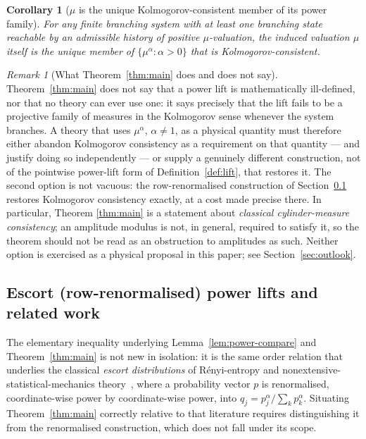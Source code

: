 \documentclass[11pt,a4paper]{article}
\newtheorem{corollary}[theorem]{Corollary}
\theoremstyle{definition}
\theoremstyle{remark}
\newtheorem{remark}[theorem]{Remark}
\begin{document}
\begin{corollary}[$\mu$ is the unique Kolmogorov-consistent member of its power family]
  \label{cor:unique}
  For any finite branching system with at least one branching state reachable by an
  admissible history of positive $\mu$-valuation, the induced valuation $\mu$ itself is
  the unique member of $\{\mu^\alpha : \alpha>0\}$ that is Kolmogorov-consistent.
\end{corollary}

\begin{remark}[What Theorem~\ref{thm:main} does and does not say]
  \label{rem:scope}
  Theorem~\ref{thm:main} does not say that a power lift is mathematically
  ill-defined, nor that no theory can ever use one: it says precisely that the lift
  fails to be a projective family of measures in the Kolmogorov sense whenever the
  system branches. A theory that uses $\mu^\alpha$, $\alpha\ne1$, as a physical
  quantity must therefore either abandon Kolmogorov consistency as a requirement on
  that quantity --- and justify doing so independently --- or supply a genuinely
  different construction, not of the pointwise power-lift form of
  Definition~\ref{def:lift}, that restores it. The second option is not vacuous: the
  row-renormalised construction of Section~\ref{sec:escort} restores Kolmogorov
  consistency exactly, at a cost made precise there. In particular, Theorem
  \ref{thm:main} is a statement about \emph{classical cylinder-measure consistency}; an
  amplitude modulus is not, in general, required to satisfy it, so the theorem should
  not be read as an obstruction to amplitudes as such. Neither option is exercised as a
  physical proposal in this paper; see Section~\ref{sec:outlook}.
\end{remark}

\subsection{Escort (row-renormalised) power lifts and related work}
\label{sec:escort}

The elementary inequality underlying Lemma~\ref{lem:power-compare} and
Theorem~\ref{thm:main} is not new in isolation: it is the same order relation that
underlies the classical \emph{escort distributions} of R\'enyi-entropy and
nonextensive-statistical-mechanics theory~\cite{Abe2000,
TsallisPlastinoAlvarezEstrada2009}, where a probability vector $p$ is renormalised,
coordinate-wise power by coordinate-wise power, into
$q_j = p_j^\alpha / \sum_k p_k^\alpha$. Situating Theorem~\ref{thm:main} correctly
relative to that literature requires distinguishing it from the renormalised
construction, which does not fall under its scope.
\end{document}
